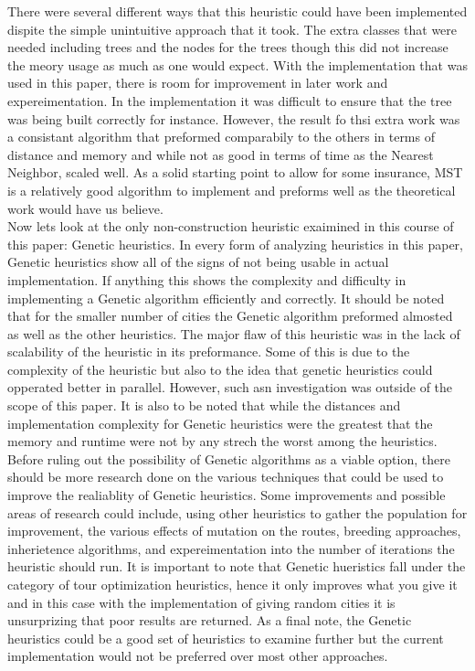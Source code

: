 \documentclass[midd]{thesis}
\newcommand{\tab}{\hspace*{2em}}
\begin{document}
\tab There were several different ways that this heuristic could have been implemented dispite the simple unintuitive approach that it took. The extra classes that were needed including trees and the nodes for the trees though this did not increase the meory usage as much as one would expect. With the implementation that was used in this paper, there is room for improvement in later work and expereimentation. In the implementation it was difficult to ensure that the tree was being built correctly for instance. However, the result fo thsi extra work was a consistant algorithm that preformed comparabily to the others in terms of distance and memory and while not as good in terms of time as the Nearest Neighbor, scaled well. As a solid starting point to allow for some insurance, MST is a relatively good algorithm to implement and preforms well as the theoretical work would have us believe.\\
\tab Now lets look at the only non-construction heuristic exaimined in this course of this paper: Genetic heuristics. In every form of analyzing heuristics in this paper, Genetic heuristics show all of the signs of not being usable in actual implementation. If anything this shows the complexity and difficulty in implementing a Genetic algorithm efficiently and correctly. It should be noted that for the smaller number of cities the Genetic algorithm preformed almosted as well as the other heuristics. The major flaw of this heuristic was in the lack of scalability of the heuristic in its preformance. Some of this is due to the complexity of the heuristic but also to the idea that genetic heuristics could opperated better in parallel. However, such asn investigation was outside of the scope of this paper. It is also to be noted that while the distances and implementation complexity for Genetic heuristics were the greatest that the memory and runtime were not by any strech the worst among the heuristics.\\
\tab Before ruling out the possibility of Genetic algorithms as a viable option, there should be more research done on the various techniques that could be used to improve the realiablity of Genetic heuristics. Some improvements and possible areas of research could include, using other heuristics to gather the population for improvement, the various effects of mutation on the routes, breeding approaches, inherietence algorithms, and expereimentation into the number of iterations the heuristic should run. It is important to note that Genetic hueristics fall under the category of tour optimization heuristics, hence it only improves what you give it and in this case with the implementation of giving random cities it is unsurprizing that poor results are returned. As a final note, the Genetic heuristics could be a good set of heuristics to examine further but the current implementation would not be preferred over most other approaches.\\
\end{document}
